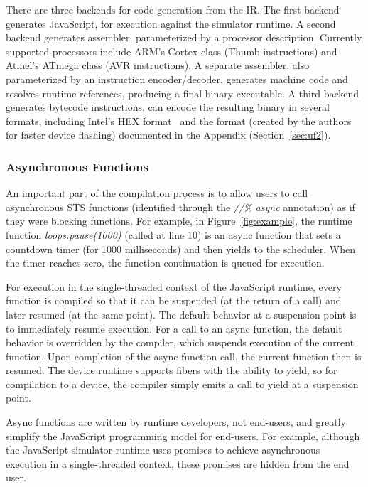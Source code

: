 There are three backends for code generation from the IR. The first backend generates JavaScript,
for execution against the simulator runtime.  A second backend generates assembler, parameterized by a
processor description.  Currently supported processors include ARM's Cortex class (Thumb instructions)
and Atmel's ATmega class (AVR instructions). A separate assembler, also parameterized by an instruction
encoder/decoder, generates machine code and resolves runtime references, producing a final binary executable. A third backend generates bytecode instructions.
\MC can encode the resulting binary in several formats,
including Intel's HEX format~\cite{IntelHEX} and the \UF format (created by
the authors for faster device flashing) documented in the Appendix (Section~\ref{sec:uf2}).

\subsubsection{Asynchronous Functions}


An important part of the compilation process is to allow users to call asynchronous
STS functions (identified through the \emph{//\% async} annotation)
as if they were blocking functions.  For example, in Figure~\ref{fig:example}, the runtime
function \emph{loops.pause(1000)} (called at line 10)
is an async function that sets a countdown timer (for 1000 milliseconds)
and then yields to the scheduler. When the timer
reaches zero, the function continuation is queued for execution.

For execution in the single-threaded context of the JavaScript runtime,
every function is compiled so that it can be suspended (at the return of a call) and later resumed (at the same point).
The default behavior at a suspension point is to immediately resume execution.  For a call to an async function,
the default behavior is overridden by the compiler, which suspends execution of the current function.
Upon completion of the async function call, the current function then is resumed.
The \CO device runtime supports fibers with the ability to yield, so for compilation to a device,
the compiler simply emits a call to yield at a suspension point.

Async functions are written by runtime developers, not end-users, and greatly simplify the JavaScript
programming model for end-users. For example, although the JavaScript simulator runtime uses promises to
achieve asynchronous execution in a single-threaded context, these promises are hidden from the end user.

